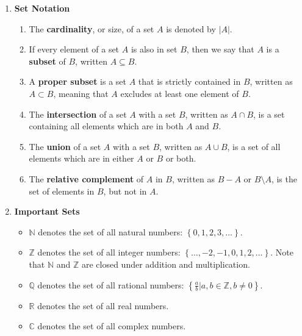 \documentclass[10pt]{article}
\newcommand{\norm}[1]{\lvert #1 \rvert}
\begin{document}
\date{}
\title{\vspace{-5ex}  \vspace{-5ex}}
\maketitle
\begin{multicols}{2}
\begin{enumerate}
    \item \textbf{Set Notation} 
    \begin{enumerate}
         \item The \textbf{cardinality}, or size, of a set $A$ is denoted by $\norm{A}$. 
         \item If every element of a set $A$ is also in set $B$, then we say that $A$ is a \textbf{subset} of $B$, written $A \subseteq B$. 
         \item A \textbf{proper subset} is a set $A$ that is strictly contained in $B$, written as $A \subset B$, meaning that $A$ excludes at least one element of $B$. 
         \item The \textbf{intersection} of a set $A$ with a set $B$, written as $A \cap B$, is a set containing all elements which are in both $A$ and $B$. 
         \item The \textbf{union} of a set $A$ with a set $B$, written as $A \cup B$, is a set of all elements which are in either $A$ or $B$ or both. 
         \item The \textbf{relative complement} of $A$ in $B$, written as $B - A$ or $B \setminus A$, is the set of elements in $B$, but not in $A$.
    \end{enumerate}

    
    \item \textbf{Important Sets} 
    \begin{itemize}
        \item $\mathbb{N}$ denotes the set of all natural numbers: $\left\{0,1,2,3,\hdots \right\}$.
        \item $\mathbb{Z}$ denotes the set of all integer numbers: $\left\{\hdots,-2,-1,0,1,2,\hdots\right\}$. Note that $\mathbb{N}$ and $\mathbb{Z}$ are closed under addition and multiplication.
        \item $\mathbb{Q}$ denotes the set of all rational numbers: $\left\{ \frac{a}{b} | a,b \in \mathbb{Z}, b \neq 0 \right\}$.
        \item $\mathbb{R}$ denotes the set of all real numbers.
        \item $\mathbb{C}$ denotes the set of all complex numbers.
    \end{itemize}
    

\end{enumerate}
\end{multicols}
\end{document}
